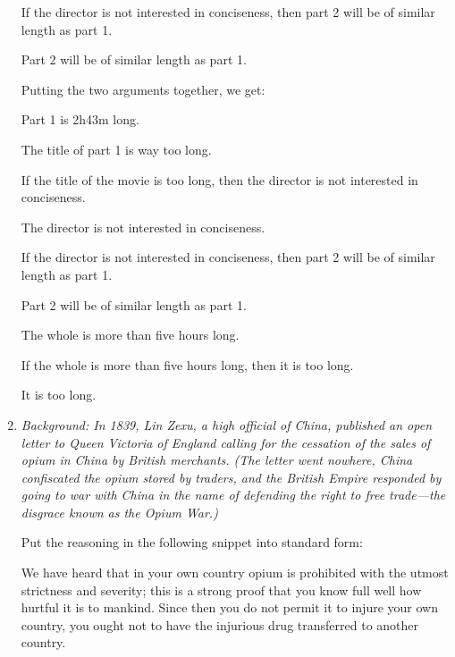 \begin{enumerate}
{\begin{argument*}
   \aitem If the director is not interested in conciseness, then part 2 will be 
   of similar length as part 1. 

   \aitem Part 2 will be of similar length as part 1. 

  \end{argument*}

  Putting the two arguments together, we get:

  \begin{argument*}

   \aitem Part 1 is 2h43m long.
   
   \aitem The title of part 1 is way too long. 

   \aitem If the title of the movie is too long, then the director is not 
   interested in conciseness. 

   \aitem The director is not interested in conciseness. 

   \aitem If the director is not interested in conciseness, then part 2 will be 
   of similar length as part 1. 

   \aitem Part 2 will be of similar length as part 1. 

   \aitem The whole is more than five hours long. 

   \aitem If the whole is more than five hours long, then it is too long.  

   \aitem It is too long. 

  \end{argument*}

 }


\item \emph{Background: In 1839,  Lin Zexu, a high official of China, published 
  an open letter to Queen Victoria of England calling for the cessation of the 
  sales of opium in China by British merchants. (The letter went nowhere, China 
  confiscated the opium stored by traders, and the British Empire responded by 
 going to war with China in the name of defending the right to free trade---the 
disgrace known as the Opium War.)}

  Put the reasoning in the following snippet into standard form:

  We have heard that in your own country opium is prohibited with the utmost
strictness and severity; this is a strong proof that you know full well how 
hurtful it is to mankind. Since then you do not permit it to injure your own 
country, you ought not to have the injurious drug transferred to another 
country.


\end{enumerate}
